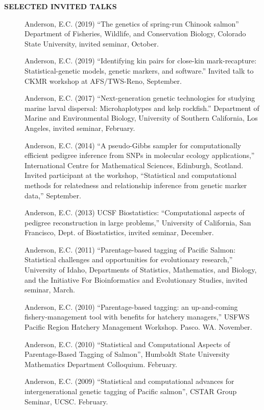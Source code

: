 \documentclass[11pt]{article}
\begin{document}
{\bf SELECTED INVITED TALKS}
\begin{description}
\item[] {\sc Anderson, E.C.} (2019) ``The genetics of spring-run Chinook salmon'' Department of Fisheries, Wildlife, and Conservation Biology, Colorado State University, invited seminar, October.
\item[] {\sc Anderson, E.C.} (2019) ``Identifying kin pairs for close-kin mark-recapture: Statistical-genetic models, genetic markers, and software.'' Invited talk to CKMR workshop at AFS/TWS-Reno, September.
\item[] {\sc Anderson, E.C.} (2017) ``Next-generation genetic technologies for studying marine larval dispersal: Microhaplotypes and kelp rockfish.'' Department of Marine and Environmental Biology,  University of Southern California, Los Angeles, invited seminar, February.
\item[] {\sc Anderson, E.C.} (2014) ``A pseudo-Gibbs sampler for computationally efficient pedigree inference from SNPs in molecular ecology applications,'' International Centre
for Mathematical Sciences, Edinburgh, Scotland. Invited participant at the workshop, ``Statistical and computational methods for relatedness and relationship inference from genetic marker data,'' September.
\item[] {\sc Anderson, E.C.} (2013) UCSF Biostatistics: ``Computational aspects of pedigree reconstruction in large problems,'' University of California, San Francisco, Dept. of 
Biostatistics, invited seminar, December.
\item[] {\sc Anderson, E.C.} (2011) ``Parentage-based  tagging of Pacific Salmon: Statistical challenges and opportunities for evolutionary research,'' University of Idaho, Departments of Statistics, Mathematics, and Biology, and the Initiative For Bioinformatics and Evolutionary Studies, invited seminar, March.
\item[] {\sc Anderson, E.C.} (2010) ``Parentage-based tagging: an up-and-coming fishery-management tool with benefits for hatchery managers,'' USFWS Pacific Region Hatchery Management Workshop. Pasco. WA. November.
\item[] {\sc Anderson, E.C.} (2010) ``Statistical and Computational Aspects of Parentage-Based Tagging of Salmon'', Humboldt State University Mathematics Department Colloquium. February.
\item[] {\sc Anderson, E.C.} (2009) ``Statistical and computational advances for intergenerational genetic tagging of Pacific salmon'', CSTAR Group Seminar, UCSC. February.

\end{description}
\end{document}
